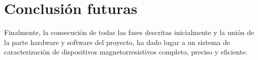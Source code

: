 
\chapter{Conclusión futuras}

Finalmente, la consecución de todas las fases descritas inicialmente y la unión de la parte hardware y software del proyecto, ha dado lugar a un sistema de caracterización de dispositivos magnetorresistivos completo, preciso y eficiente.

%
%
%
%
%
%
